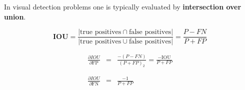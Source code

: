 {

In visual detection problems one is typically evaluated by {\bf intersection over union}.

$$\mathbf{IOU} = \frac{|\mbox{true positives} \cap \mbox{false positives}|}{|\mbox{true positives} \cup\mbox{false positives}|} = \frac{P - FN}{P + FP}$$

\vfill
\begin{eqnarray*}
    \frac{\partial \mathrm{}IOU}{\partial \mathrm{FP}} & =  & \frac{-(P - FN)}{(P + FP)_2} = \frac{-\mathrm{IOU}}{P+ FP} \\
    \\ \\
    \frac{\partial \mathrm{}IOU}{\partial \mathrm{FN}} & =  & \frac{-1}{P + FP}
\end{eqnarray*}


}

